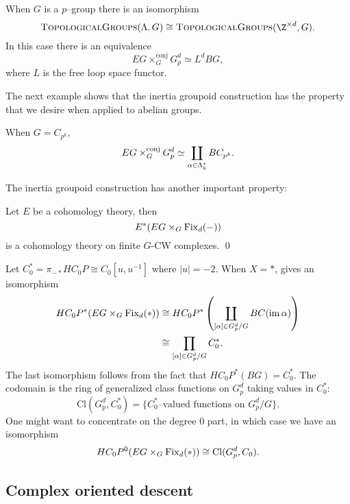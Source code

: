 \begin{example}
When \(G\) is a \(p\)--group there is an isomorphism
\[
\CatOf{TopologicalGroups}(\Lambda,G) \cong \CatOf{TopologicalGroups}(\Z^{\times d}, G).
\]
In this case there is an equivalence
\[
EG \times_{G}^{\mathrm{conj}} G_{p}^{d} \simeq L^dBG,
\]
where \(L\) is the free loop space functor. 
\end{example}

The next example shows that the inertia groupoid construction has the property that we desire when applied to abelian groups.
\begin{example} \label{zpk}
When \(G = C_{p^k}\),
\[
EG \times_{G}^{\text{conj}} G_{p}^{d} \simeq \coprod_{\alpha \in \Lambda_k^*} BC_{p^k}.
\]
\end{example}

The inertia groupoid construction has another important property: 
\begin{proposition}
Let \(E\) be a cohomology theory, then
\[
E^*(EG \times_G \operatorname{Fix}_d(-))
\]
is a cohomology theory on finite \(G\)-CW complexes. \pushQED\qed \qedhere \popQED
\end{proposition}




\begin{example} \label{app:classfncs}
Let \(C_{0}^{*} = \pi_{-*}HC_0P \cong C_0[u,u^{-1}]\) where \(|u|=-2\). When \(X = *\),  gives an isomorphism
\begin{align*}
HC_{0}P^*(EG \times_G \operatorname{Fix}_d(*)) &\cong HC_{0}P^{*}\left(\coprod_{[\alpha] \in G_{p}^{d}/G} BC(\operatorname{im} \alpha)\right) \\
&\cong \prod_{[\alpha] \in G_{p}^{d}/G}C_{0}^{*}.
\end{align*}
The last isomorphism follows from the fact that \(HC_{0}P^{*}(BG) = C_{0}^{*}\). The codomain is the ring of generalized class functions on \(G_{p}^{d}\) taking values in \(C_{0}^{*}\):
\[
\mathrm{Cl}(G_{p}^{d}, C_{0}^{*}) = \{C_{0}^{*} \text{--valued functions on } G_{p}^{d}/G\}.
\]
One might want to concentrate on the degree \(0\) part, in which case we have an isomorphism
\[
HC_{0}P^0(EG \times_G \operatorname{Fix}_d(*)) \cong \mathrm{Cl}(G_{p}^{d}, C_{0}).
\]
\end{example}


\subsection*{Complex oriented descent}

